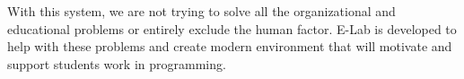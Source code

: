 \documentclass{article}
\begin{document}
With this system, we are not trying to solve all the organizational and
educational problems or entirely exclude the human factor. E-Lab is developed to
help with these problems and create modern environment that will motivate and
support students work in programming.




\end{document}

